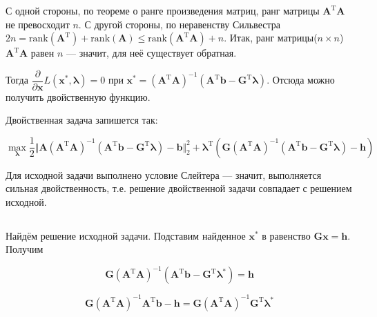 	С одной стороны, по теореме о ранге произведения матриц, ранг матрицы $\mathbf{A}^{\text{T}}\mathbf{A}$ не превосходит $n$. С другой стороны, по неравенству Сильвестра $2n = \text{rank}(\mathbf{A}^{\text{T}}) + \text{rank}(\mathbf{A}) \leqslant \text{rank}(\mathbf{A}^{\text{T}}\mathbf{A}) + n$. Итак, ранг матрицы($n\times n$) $\mathbf{A}^{\text{T}}\mathbf{A}$ равен $n$ --- значит, для неё существует обратная.
	
	Тогда $\dfrac{\partial}{\partial \mathbf{x}}L(\mathbf{x}^{*},\boldsymbol{\lambda}) = 0$ при $\mathbf{x}^{*} =(\mathbf{A}^{\text{T}}\mathbf{A})^{-1}(\mathbf{A}^{\text{T}}\mathbf{b} -\mathbf{G}^{\text{T}}\boldsymbol{\lambda})$. Отсюда можно получить двойственную функцию. 
	
	Двойственная задача запишется так:
	
	\begin{equation}
	\max_{\mathbf{\lambda}} \frac 12 \Vert \mathbf{A}(\mathbf{A}^{\text{T}}\mathbf{A})^{-1}(\mathbf{A}^{\text{T}}\mathbf{b} -\mathbf{G}^{\text{T}}\boldsymbol{\lambda})-\mathbf{b} \Vert_2^2 +\boldsymbol{\lambda}^{\text{T}} \left( \mathbf{G}(\mathbf{A}^{\text{T}}\mathbf{A})^{-1}(\mathbf{A}^{\text{T}}\mathbf{b} -\mathbf{G}^{\text{T}}\boldsymbol{\lambda})-\textbf{h}\right) 
	\end{equation}
	
	Для исходной задачи выполнено условие Слейтера --- значит, выполняется сильная двойственность, т.е. решение двойственной задачи совпадает с решением исходной.
	 
	\subsection{}
	
	 Найдём решение исходной задачи. Подставим найденное $\mathbf{x}^{*}$ в равенство $\mathbf{G}\mathbf{x}=\mathbf{h}$. Получим
	
	\begin{equation}
	\mathbf{G}(\mathbf{A}^{\text{T}}\mathbf{A})^{-1}(\mathbf{A}^{\text{T}}\mathbf{b} -\mathbf{G}^{\text{T}}\boldsymbol{\lambda}^{*}) = \mathbf{h}
	\end{equation}
	
	\begin{equation}
	\mathbf{G}(\mathbf{A}^{\text{T}}\mathbf{A})^{-1}\mathbf{A}^{\text{T}}\mathbf{b} - \mathbf{h}=\mathbf{G}(\mathbf{A}^{\text{T}}\mathbf{A})^{-1}\mathbf{G}^{\text{T}}\boldsymbol{\lambda}^{*}
	\end{equation}
	
